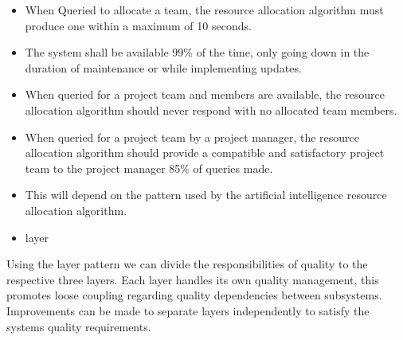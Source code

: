 \documentclass[a4paper,12pt]{article}
\begin{document}
    \begin{itemize}
        \item When Queried to allocate a team, the resource allocation algorithm must produce one within a maximum of 10 seconds.
        
        \item The system shall be available 99\% of the time, only going down in the duration of maintenance or while implementing updates.
        
        \item When queried for a project team and members are available, the resource allocation algorithm should never respond with no allocated team members. 
        
        \item When queried for a project team by a project manager, the resource allocation algorithm should provide a compatible and satisfactory project team to the project manager 85\% of queries made. 
    \end{itemize}
    
    \begin{itemize}
        \item This will depend on the pattern used by the artificial intelligence resource allocation algorithm. 
        \item layer
    \end{itemize}
    Using the layer pattern we can divide the responsibilities of quality to the respective three layers. Each layer handles its own quality management, this promotes loose coupling regarding quality dependencies between subsystems. Improvements can be made to separate layers independently to satisfy the systems quality requirements.
    
\end{document}
